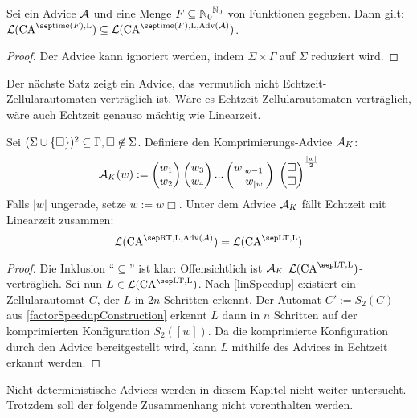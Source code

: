 \begin{lemma}
    \label{lemmaIgnoriereAdvice}
    Sei ein Advice $\mathcal{A}$ und eine Menge
    $F \subseteq {\mathbb{N}_0}^{\mathbb{N}_0}$ von Funktionen gegeben.
    Dann gilt: $\mathcal{L}(\CAM{ \mathrm{time}(F), \CALeft }) \subseteq  \mathcal{L}(\CAM{ \mathrm{time}(F), \CALeft, \orakel(\advA)})$.
\end{lemma}
\begin{proof}
    Der Advice kann ignoriert werden, indem $\Sigma \times \Gamma$ auf $\Sigma$ reduziert wird.
\end{proof}

Der nächste Satz zeigt ein Advice, das vermutlich nicht Echtzeit-Zellularautomaten-verträglich ist.
Wäre es Echtzeit-Zellularautomaten-verträglich, wäre auch Echtzeit genauso mächtig wie Linearzeit.

\begin{satz}
    Sei $(\Sigma \cup \{ {\Box} \}) ^2 \subseteq \Gamma, \Box \not\in \Sigma$.
    Definiere den Komprimierungs-Advice $\mathcal{A}_K$:
    \[
        \advA_K(w) := 
                  \Spvek{w_1; w_2} \Spvek{w_3; w_4} ... \Spvek{w_{|w-1|}; w_{|w|}}
                        \; \Spvek{\Box; \Box}^\frac{|w|}{2}
    \]
    Falls $|w|$ ungerade, setze $w := w\Box$.
    Unter dem Advice $\mathcal{A}_K$ fällt Echtzeit mit Linearzeit zusammen:
    \[
        \CAL{\CART, \CALeft, \orakel({\advA})} = \CAL{\CALT, \CALeft}
    \]
\end{satz}
\begin{proof}
    Die Inklusion \enquote{$\subseteq$} ist klar: Offensichtlich ist $\mathcal{A}_K$ $\CAL{\CALT, \CALeft}$-verträglich.
    Sei nun $L \in \CAL{\CALT, \CALeft}$.
    Nach \cref{linSpeedup} existiert ein Zellularautomat $C$, der $L$ in $2n$ Schritten erkennt.
    Der Automat $C' := S_2(C)$ aus \cref{factorSpeedupConstruction}
    erkennt $L$ dann in $n$ Schritten auf der komprimierten Konfiguration $S_2([w])$.
    Da die komprimierte Konfiguration durch den Advice bereitgestellt wird, kann $L$ mithilfe des Advices in Echtzeit erkannt werden.
\end{proof}

Nicht-deterministische Advices werden in diesem Kapitel nicht weiter untersucht.
Trotzdem soll der folgende Zusammenhang nicht vorenthalten werden.

